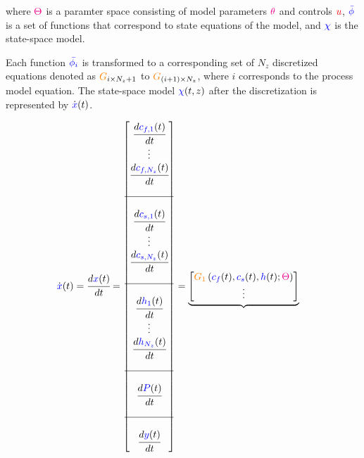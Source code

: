 \documentclass[../Article_Model_Parameters.tex]{subfiles}
\begin{document}
		where ${\color{magenta}\Theta}$ is a paramter space consisting of model parameters ${\color{magenta}\theta}$ and controls ${\color{red}u}$, ${\color{blue}\bar{\phi}}$ is a set of functions that correspond to state equations of the model, and ${\color{blue}\chi}$ is the state-space model.
		
		Each function ${\color{blue}\bar{\phi_i}}$ is transformed to a corresponding set of $N_z$ discretized equations denoted as ${\color{orange}G}_{i\times N_z+1}$ to ${\color{orange}G}_{(i+1)\times N_z}$, where $i$ corresponds to the process model equation. The state-space model ${\color{blue}\chi}(t,z)$ after the discretization is represented by $\dot{{\color{blue}x}}(t)$.
			
			{\footnotesize
				\begin{align*} \label{discretization}
					\dot{{\color{blue}x}}(t) &= \cfrac{d {\color{blue}x}(t)}{d t} = 
					\begin{bmatrix}
						\cfrac{d {\color{blue}c_{f,1}}(t)}{d t} 	  \\
						\vdots					  \\
						\cfrac{d {\color{blue}c_{f,N_z}}(t)}{d t} \\
						\\ \hline \\
						\cfrac{d {\color{blue}c_{s,1}}(t)}{d t} 	  \\
						\vdots					  \\
						\cfrac{d {\color{blue}c_{s,N_z}}(t)}{d t} \\
						\\ \hline \\
						\cfrac{d {\color{blue}h_1}(t)}{d t} 	  \\
						\vdots 					  \\
						\cfrac{d {\color{blue}h_{N_z}}(t)}{d t} \\
						\\ \hline \\
						\cfrac{d {\color{blue}P}(t)}{d t} \\
						\\ \hline \\
						\cfrac{d {\color{blue}y}(t)}{d t}
					\end{bmatrix}
					=
					\underbrace{\begin{bmatrix}
							{\color{orange}G_1} \left( {\color{blue}c_f}(t),{\color{blue}c_s}(t),{\color{blue}h}(t); {\color{magenta}\Theta} \right)\\ 
							\vdots\\ 

\end{bmatrix}}
\end{align*}}
\end{document}
